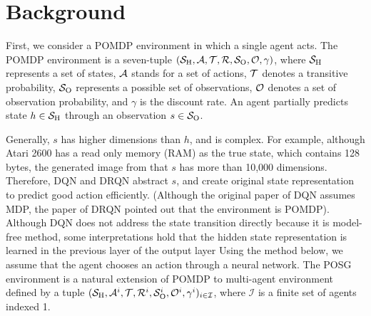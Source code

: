 \section{Background}
First, we consider a POMDP environment in which a single agent acts.
The POMDP environment is a seven-tuple $(\S, \A, \Trans, \R, \Observations, \ObProb, \gamma)$,
where $\S$ represents a set of states, $\A$ stands for a set of actions, $\Trans$ denotes a transitive probability, 
$\Observations$ represents a possible set of observations, $\ObProb$ denotes a set of observation probability, and
$\gamma$ is the discount rate.
An agent partially predicts state $h \in \S$ through an observation $s \in \Observations$.

Generally, $s$ has higher dimensions than $h$, and is complex.
For example, although Atari 2600 has a read only memory (RAM) as the true state, which contains 128 bytes,
the generated image from that $s$ has more than 10,000 dimensions.
Therefore, DQN and DRQN abstract $s$, and create original state representation to predict good action efficiently.
(Although the original paper of DQN assumes MDP, the paper of DRQN pointed out that the environment is POMDP).
Although DQN does not address the state transition directly because it is model-free method, 
some interpretations hold that the hidden state representation is learned in the previous layer of the output layer \citep{zahavy2016graying}
Using the method below, we assume that the agent chooses an action through a neural network.
The POSG environment is a natural extension of POMDP to multi-agent environment defined by a tuple $(\S, \A^i, \Trans, \R^i, \Observations^i, \ObProb^i, \gamma^i)_{i \in \mathcal{I}}$,
where $\mathcal{I}$ is a finite set of agents indexed 1.


